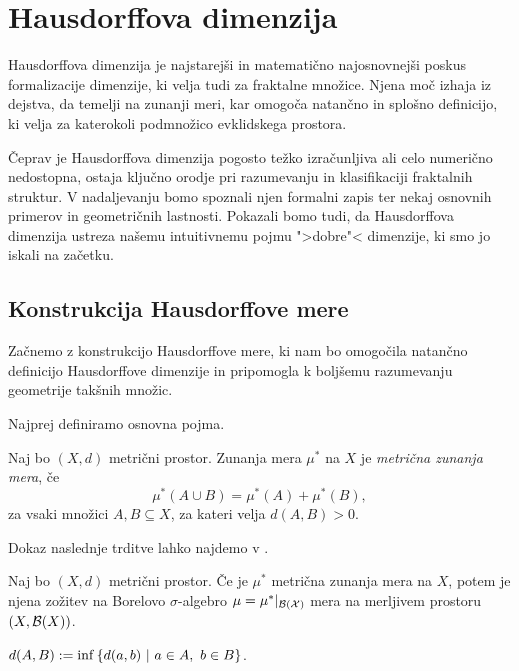 \section{Hausdorffova dimenzija}
Hausdorffova dimenzija je najstarejši in matematično najosnovnejši poskus formalizacije dimenzije, ki velja tudi za fraktalne množice. Njena moč izhaja iz dejstva, da temelji na zunanji meri, kar omogoča natančno in splošno definicijo, ki velja za katerokoli podmnožico evklidskega prostora.

Čeprav je Hausdorffova dimenzija pogosto težko izračunljiva ali celo numerično nedostopna, ostaja ključno orodje pri razumevanju in klasifikaciji fraktalnih struktur. V nadaljevanju bomo spoznali njen formalni zapis ter nekaj osnovnih primerov in geometričnih lastnosti. Pokazali bomo tudi, da Hausdorffova dimenzija ustreza našemu intuitivnemu pojmu ">dobre"< dimenzije, ki smo jo iskali na začetku.

\subsection{Konstrukcija Hausdorffove mere}
Začnemo z konstrukcijo Hausdorffove mere, ki nam bo omogočila natančno definicijo Hausdorffove dimenzije in pripomogla k boljšemu razumevanju geometrije takšnih množic.

Najprej definiramo osnovna pojma.

\begin{definicija}
    Naj bo \((X, d)\) metrični prostor. Zunanja mera \(\mu^*\) na \(X\) je \emph{metrična zunanja mera}, če 
    \[\mu^*(A \cup B) = \mu^*(A) + \mu^*(B),\]
    za vsaki množici \(A, B \subseteq X\), za kateri velja \(d(A, B) > 0\).
\end{definicija}

Dokaz naslednje trditve lahko najdemo v \cite[stran 349]{f-ra}.
\begin{trditev}
    \label{m-zun-mera}
    Naj bo \((X, d)\) metrični prostor. Če je \(\mu^*\) metrična zunanja mera na \(X\), potem je njena zožitev na Borelovo \(\sigma\)-algebro \(\mu = \mu^*|_{\mathcal{B(X)}}\) mera na merljivem prostoru \((X, \mathcal{B}(X))\).
\end{trditev}

\begin{opomba}
    \(d(A, B) := \inf\left\{d(a, b) \ | \ a \in A,\ b \in B\right\}\).
\end{opomba}



